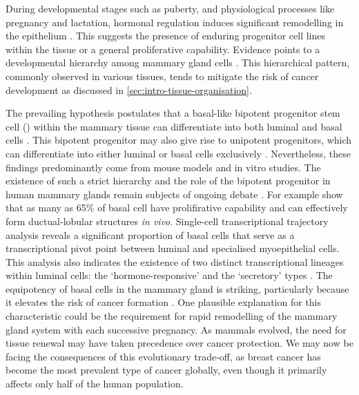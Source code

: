During developmental stages such as puberty, and physiological processes like pregnancy and lactation, hormonal regulation induces significant remodelling in the epithelium \parencite{Macias2012-su}. This suggests the presence of enduring progenitor cell lines within the tissue or a general proliferative capability. Evidence points to a developmental hierarchy among mammary gland cells \parencite{Skibinski2015-rh}. This hierarchical pattern, commonly observed in various tissues, tends to mitigate the risk of cancer development as discussed in \cref{sec:intro-tissue-organisation}.

The prevailing hypothesis postulates that a basal-like bipotent progenitor stem cell () within the mammary tissue can differentiate into both luminal and basal cells \parencite{Stingl2001-cb,Prater2014-qd,Rios2014-jj}. This bipotent progenitor may also give rise to unipotent progenitors, which can differentiate into either luminal or basal cells exclusively \parencite{Van_Keymeulen2011-um,Rios2014-jj,Tao2014-ol}. Nevertheless, these findings predominantly come from mouse models and in vitro studies. The existence of such a strict hierarchy and the role of the bipotent progenitor in human mammary glands remain subjects of ongoing debate \parencite{Skibinski2015-rh}. For example \textcite{Prater2014-qd} show that as many as 65\% of basal cell have prolifirative capability and can effectively form ductual-lobular structures \emph{in vivo}. Single-cell transcriptional trajectory analysis reveals a significant proportion of  basal cells that serve as a transcriptional pivot point between luminal and specialised myoepithelial cells. This analysis also indicates the existence of two distinct transcriptional lineages within luminal cells: the `hormone-responsive' and the `secretory' types \parencite{Nguyen2018-jl}. The equipotency of basal cells in the mammary gland is striking, particularly because it elevates the risk of cancer formation . One plausible explanation for this characteristic could be the requirement for rapid remodelling of the mammary gland system with each successive pregnancy. As mammals evolved, the need for tissue renewal may have taken precedence over cancer protection. We may now be facing the consequences of this evolutionary trade-off, as breast cancer has become the most prevalent type of cancer globally, even though it primarily affects only half of the human population.

